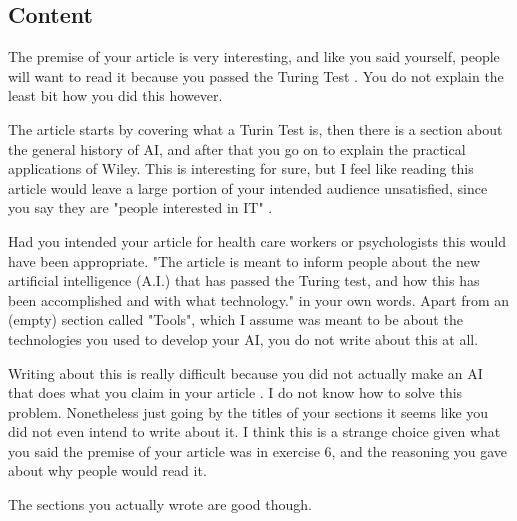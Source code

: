 \documentclass[12pt, a4paper]{article}
\begin{document}
\subsection{Content}
The premise of your article is very interesting, and like you said yourself, people will want to read it because you passed the Turing Test \cite{mick}. You do not explain the least bit how you did this however.

The article starts by covering what a Turin Test is, then there is a section about the general history of AI, and after that you go on to explain the practical applications of Wiley. This is interesting for sure, but I feel like reading this article would leave a large portion of your intended audience unsatisfied, since you say they are "people interested in IT" \cite{mick}.

Had you intended your article for health care workers or psychologists this would have been appropriate. "The article is meant to inform people about the new artificial intelligence (A.I.)
that has passed the Turing test, and how this has been accomplished and with
what technology." \cite{mick} in your own words. Apart from an (empty) section called "Tools", which I assume was meant to be about the technologies you used to develop your AI, you do not write about this at all.

Writing about this is really difficult because you did not actually make an AI that does what you claim in your article \cite{mick}. I do not know how to solve this problem. Nonetheless just going by the titles of your sections it seems like you did not even intend to write about it. I think this is a strange choice given what you said the premise of your article was in exercise 6, and the reasoning you gave about why people would read it.

The sections you actually wrote are good though.

\printbibliography
\end{document}
